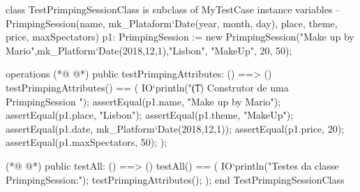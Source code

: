 \begin{vdmpp}[breaklines=true]
class TestPrimpingSessionClass is subclass of MyTestCase
instance variables
 -- PrimpingSession(name, mk_Plataform`Date(year, month, day), place, theme, price, maxSpectators)
 p1: PrimpingSession := new PrimpingSession("Make up by Mario",mk_Platform`Date(2018,12,1),"Lisbon", "MakeUp", 20, 50);
  
operations
(*@
\label{testPrimpingAttributes:7}
@*)
 public testPrimpingAttributes: () ==> ()
 testPrimpingAttributes() == (
 IO`println("\t (1) Construtor de uma PrimpingSession ");
  assertEqual(p1.name, "Make up by Mario");
  assertEqual(p1.place, "Lisbon");
  assertEqual(p1.theme, "MakeUp");
  assertEqual(p1.date, mk_Platform`Date(2018,12,1));
  assertEqual(p1.price, 20);
  assertEqual(p1.maxSpectators, 50);
 );
  
(*@
\label{testAll:18}
@*)
 public testAll: () ==> ()
 testAll() == (
 IO`println("Testes da classe PrimpingSession:");
  testPrimpingAttributes();
 );
end TestPrimpingSessionClass
\end{vdmpp}

